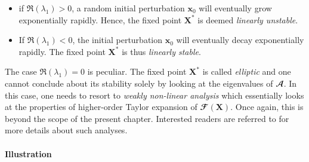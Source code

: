   \begin{itemize}
    \item if $\Re \left( \lambda_1 \right) > 0$, a random initial perturbation $\mathbf{x}_0$ will eventually grow exponentially rapidly. Hence, the fixed point $\mathbf{X}^*$ is deemed \emph{linearly unstable}.

    \item If $\Re \left( \lambda_1 \right) < 0$, the initial perturbation $\mathbf{x}_0$ will eventually decay exponentially rapidly. The fixed point $\mathbf{X}^*$ is thus \emph{linearly stable}.
  \end{itemize}
  The case $\Re \left( \lambda_1 \right) = 0$ is peculiar. The fixed point $\mathbf{X}^*$ is called \emph{elliptic} and one cannot conclude about its stability solely by looking at the eigenvalues of $\mathbfcal{A}$. In this case, one needs to resort to \emph{weakly non-linear analysis} which essentially looks at the properties of higher-order Taylor expansion of $\mathbfcal{F} \left( \mathbf{X} \right)$. Once again, this is beyond the scope of the present chapter. Interested readers are referred to \cite{SS1971} for more details about such analyses.

  \paragraph*{Illustration}

